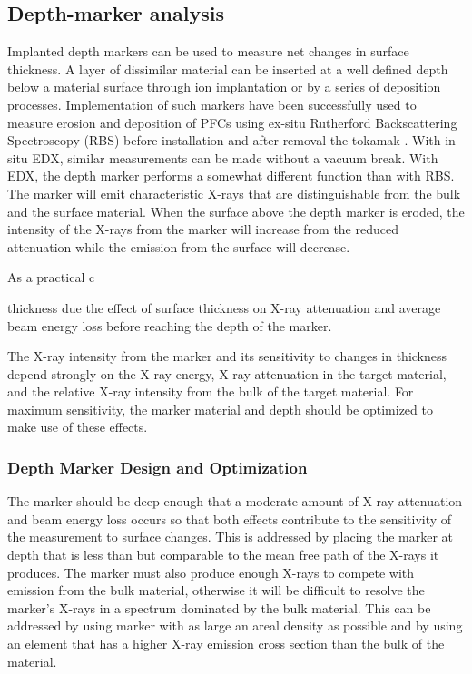 \documentclass[12pt,letterpaper,final]{article}
\begin{document}
\subsection{Depth-marker analysis}

Implanted depth markers can be used to measure net changes in surface thickness. A layer of dissimilar material can be inserted at a well defined depth below a material surface through ion implantation or by a series of deposition processes. Implementation of such markers have been successfully used to measure erosion and deposition of PFCs using ex-situ Rutherford Backscattering Spectroscopy (RBS) before installation and after removal the tokamak \cite{Wampler}. With in-situ EDX, similar measurements can be made without a vacuum break. With EDX, the depth marker performs a somewhat different function than with RBS. The marker will emit characteristic X-rays that are distinguishable from the bulk and the surface material. When the surface above the depth marker is eroded, the intensity of the X-rays from the marker will increase from the reduced attenuation while the emission from the surface will decrease. 

As a practical c 


 thickness due the effect of surface thickness on X-ray attenuation and average beam energy loss before reaching the depth of the marker. 

The X-ray intensity from the marker and its sensitivity to changes in thickness depend strongly on the X-ray energy, X-ray attenuation in the target material, and the relative X-ray intensity from the bulk of the target material. For maximum sensitivity, the marker material and depth should be optimized to make use of these effects.

\subsubsection{Depth Marker Design and Optimization}

The marker should be deep enough that a moderate amount of X-ray attenuation and beam energy loss occurs so that both effects contribute to the sensitivity of the measurement to surface changes. This is addressed by placing the marker at depth that is less than but comparable to the mean free path of the X-rays it produces. The marker must also produce enough X-rays to compete with emission from the bulk material, otherwise it will be difficult to resolve the marker's X-rays in a spectrum dominated by the bulk material. This can be addressed by using marker with as large an areal density as possible and by using an element that has a higher X-ray emission cross section than the bulk of the material.
\end{document}
